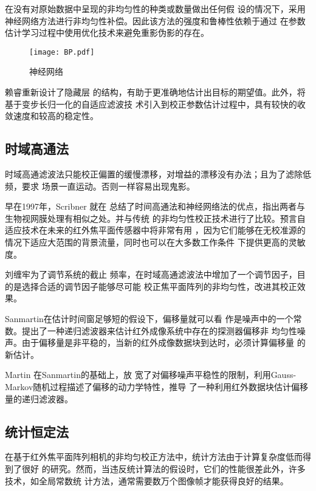 \documentclass[../main]{subfiles}
\begin{document}
\cite{Torres2003Adaptive}在没有对原始数据中呈现的非均匀性的种类或数量做出任何假
设的情况下，采用神经网络方法进行非均匀性补偿。因此该方法的强度和鲁棒性依赖于通过
在参数估计学习过程中使用优化技术来避免重影伪影的存在。

\begin{figure}[htbp]
\centering
\texttt{[image: BP.pdf]}
\caption{神经网络}
\label{fig:神经网络}
\end{figure}

赖睿\cite{赖睿2009场景自适应的红外焦平面阵列非均匀性校正新方法}重新设计了隐藏层
的结构，有助于更准确地估计出目标的期望值。此外，将基于变步长归一化的自适应滤波技
术引入到校正参数估计过程中，具有较快的收敛速度和较高的稳定性。

\subsection{时域高通法}%
\label{sub:时域高通法}

时域高通滤波法只能校正偏置的缓慢漂移，对增益的漂移没有办法；且为了滤除低频，要求
场景一直运动。否则一样容易出现鬼影。

早在1997年，Scribner 就在\cite{Scribner1990Nonuniformity, Scribner1991Adaptive}
总结了时间高通法和神经网络法的优点，指出两者与生物视网膜处理有相似之处。并与传统
的非均匀性校正技术进行了比较。预言自适应技术在未来的红外焦平面传感器中将非常有用
，因为它们能够在无校准源的情况下适应大范围的背景流量，同时也可以在大多数工作条件
下提供更高的灵敏度。

刘缠牢\cite{刘缠牢2006红外图像非均匀性校正高通滤波算法的改进}为了调节系统的截止
频率，在时域高通滤波法中增加了一个调节因子，目的是选择合适的调节因子能够尽可能
校正焦平面阵列的非均匀性，改进其校正效果。

Sanmartin\cite{Sanmartin2008Extended}在估计时间窗足够短的假设下，偏移量就可以看
作是噪声中的一个常数。提出了一种递归滤波器来估计红外成像系统中存在的探测器偏移非
均匀性噪声。由于偏移量是非平稳的，当新的红外成像数据块到达时，必须计算偏移量
的新估计。

Martin\cite{Martin2010Block} 在Sanmartin\cite{Sanmartin2008Extended}的基础上，放
宽了对偏移噪声平稳性的限制，利用Gauss-Markov随机过程描述了偏移的动力学特性，推导
了一种利用红外数据块估计偏移量的递归滤波器。

\subsection{统计恒定法}%
\label{sub:统计恒定法}

在基于红外焦平面阵列相机的非均匀校正方法中，统计方法由于计算复杂度低而得到了很好
的研究。然而，当违反统计算法的假设时，它们的性能很差此外，许多技术，如全局常数统
计方法，通常需要数万个图像帧才能获得良好的结果。
\end{document}
